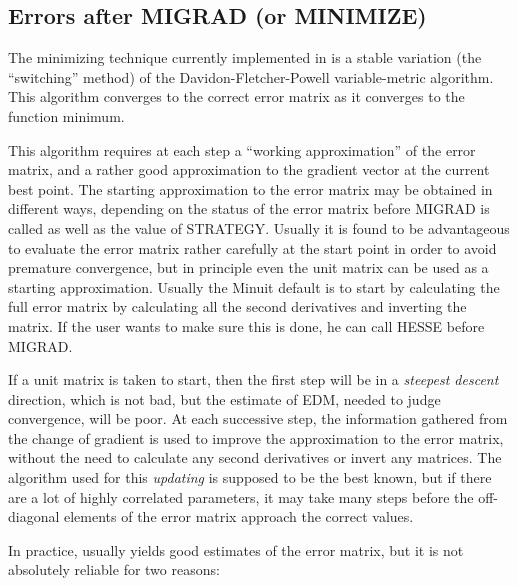 \subsection{Errors after MIGRAD (or MINIMIZE)}
 
The minimizing technique currently implemented in  is a 
stable variation (the ``switching'' method) of the 
Davidon-Fletcher-Powell variable-metric algorithm.
This algorithm converges to the correct error matrix as it converges 
to the function minimum. 

This algorithm requires at each step a ``working approximation'' of the
error matrix, and a rather good approximation to the gradient vector at
the current best point. 
The starting approximation to the error matrix may be obtained in different
ways, depending on the status of the error matrix before MIGRAD is called
as well as the value of STRATEGY.  Usually it is found to be advantageous 
to evaluate the error matrix rather carefully at the start point in order
to avoid premature convergence, but in principle even the unit matrix
can be used as a starting approximation.  
Usually the Minuit default is to start by calculating the full error matrix by
calculating all the second derivatives and inverting the matrix.
If the user wants to make sure this is done, he can call HESSE before MIGRAD.

If a unit matrix is taken to start,
then the first step will be in a {\em steepest descent} direction, which is
not bad, but the estimate of EDM, needed to judge convergence, will be poor.
At each successive step, the information gathered from the change of gradient
is used to improve the approximation to the error matrix, without the need
to calculate any second derivatives or invert any matrices.
The algorithm used for this {\em updating} is supposed to be the best known,
but if there are a lot of highly correlated parameters, it may take many steps
before the off-diagonal elements of the error matrix approach the correct values.

In practice,  usually yields good estimates of the 
error matrix, but it is not absolutely reliable for two reasons:
 
